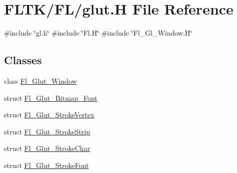 \hypertarget{glut_8_h}{}\section{F\+L\+T\+K/\+F\+L/glut.H File Reference}
\label{glut_8_h}
{\ttfamily \#include \char`\"{}gl.\+h\char`\"{}}\newline
{\ttfamily \#include \char`\"{}Fl.\+H\char`\"{}}\newline
{\ttfamily \#include \char`\"{}Fl\+\_\+\+Gl\+\_\+\+Window.\+H\char`\"{}}\newline
\subsection*{Classes}
\begin{DoxyCompactItemize}
\item 
class \hyperlink{class_fl___glut___window}{Fl\+\_\+\+Glut\+\_\+\+Window}
\item 
struct \hyperlink{struct_fl___glut___bitmap___font}{Fl\+\_\+\+Glut\+\_\+\+Bitmap\+\_\+\+Font}
\item 
struct \hyperlink{struct_fl___glut___stroke_vertex}{Fl\+\_\+\+Glut\+\_\+\+Stroke\+Vertex}
\item 
struct \hyperlink{struct_fl___glut___stroke_strip}{Fl\+\_\+\+Glut\+\_\+\+Stroke\+Strip}
\item 
struct \hyperlink{struct_fl___glut___stroke_char}{Fl\+\_\+\+Glut\+\_\+\+Stroke\+Char}
\item 
struct \hyperlink{struct_fl___glut___stroke_font}{Fl\+\_\+\+Glut\+\_\+\+Stroke\+Font}
\end{DoxyCompactItemize}
